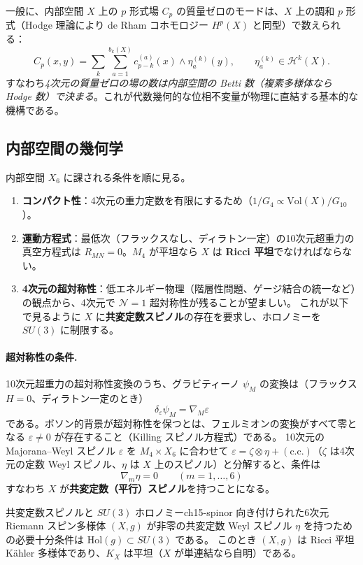 一般に、内部空間 $X$ 上の $p$ 形式場 $C_p$ の質量ゼロのモードは、$X$ 上の調和 $p$ 形式（Hodge 理論により de Rham コホモロジー $H^p(X)$ と同型）で数えられる：
\[
C_p(x,y) = \sum_{k}\sum_{a=1}^{b_k(X)}c^{(a)}_{p-k}(x)\wedge\eta^{(k)}_a(y),\qquad \eta^{(k)}_a\in\mathcal H^k(X).
\]
すなわち\emph{4次元の質量ゼロの場の数は内部空間の Betti 数（複素多様体なら Hodge 数）で決まる}。これが代数幾何的な位相不変量が物理に直結する基本的な機構である。

\subsection{内部空間の幾何学}

内部空間 $X_6$ に課される条件を順に見る。
\begin{enumerate}
\item \textbf{コンパクト性}：4次元の重力定数を有限にするため（$1/G_4\propto\mathrm{Vol}(X)/G_{10}$）。
\item \textbf{運動方程式}：最低次（フラックスなし、ディラトン一定）の10次元超重力の真空方程式は $R_{MN} = 0$。$M_4$ が平坦なら $X$ は \textbf{Ricci 平坦}でなければならない。
\item \textbf{4次元の超対称性}：低エネルギー物理（階層性問題、ゲージ結合の統一など）の観点から、4次元で $\mathcal N=1$ 超対称性が残ることが望ましい。
これが以下で見るように $X$ に\textbf{共変定数スピノル}の存在を要求し、ホロノミーを $SU(3)$ に制限する。
\end{enumerate}

\paragraph{超対称性の条件.}
10次元超重力の超対称性変換のうち、グラビティーノ $\psi_M$ の変換は（フラックス $H = 0$、ディラトン一定のとき）
\[
\delta_\varepsilon\psi_M = \nabla_M\varepsilon
\]
である。ボソン的背景が超対称性を保つとは、フェルミオンの変換がすべて零となる $\varepsilon\neq0$ が存在すること（Killing スピノル方程式）である。
10次元の Majorana--Weyl スピノル $\varepsilon$ を $M_4\times X_6$ に合わせて $\varepsilon = \zeta\otimes\eta + (\text{c.c.})$（$\zeta$ は4次元の定数 Weyl スピノル、$\eta$ は $X$ 上のスピノル）と分解すると、条件は
\[
\nabla_m\eta = 0\qquad(m = 1,\dots,6)
\]
すなわち $X$ が\textbf{共変定数（平行）スピノル}を持つことになる。

\begin{mythm}{共変定数スピノルと $SU(3)$ ホロノミー}{ch15-spinor}
向き付けられた6次元 Riemann スピン多様体 $(X,g)$ が非零の共変定数 Weyl スピノル $\eta$ を持つための必要十分条件は $\mathrm{Hol}(g)\subset SU(3)$ である。
このとき $(X,g)$ は Ricci 平坦 K\"ahler 多様体であり、$K_X$ は平坦（$X$ が単連結なら自明）である。
\end{mythm}

